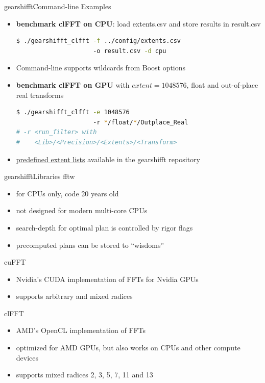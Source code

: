 \documentclass[t,11pt,hyperref={
  pdftitle = {gearshifft},
  pdfsubject = {gearshifft},
  pdfborder={0 0 0},
  colorlinks=true,
  urlcolor=red,
  citecolor=red,
  linkcolor=red,
  pdfauthor={Peter Steinbach, Matthias Werner}
  }
]{beamer}
\begin{document}
\begin{frame}[fragile]{gearshifft}{Command-line Examples}
  \begin{itemize}[<+->]
\item 
\textbf{benchmark clFFT on CPU}: load extents.csv and store results in result.csv
\begin{lstlisting}[numbers=none,language=bash]
$ ./gearshifft_clfft -f ../config/extents.csv
                     -o result.csv -d cpu
\end{lstlisting}

\item Command-line supports wildcards from Boost options
\item 
\textbf{benchmark clFFT on GPU} with $extent=1048576$, float and out-of-place real transforms
\begin{lstlisting}[numbers=none,language=bash]
$ ./gearshifft_clfft -e 1048576
                     -r */float/*/Outplace_Real
# -r <run_filter> with 
#    <Lib>/<Precision>/<Extents>/<Transform>
\end{lstlisting}
\item \href{https://github.com/mpicbg-scicomp/gearshifft/tree/master/config}{predefined extent lists} available in the gearshifft repository
\end{itemize}  
\end{frame}


\begin{frame}{gearshifft}{Libraries}
  fftw
  \begin{itemize}
  \item for CPUs only, code 20 years old
  \item not designed for modern multi-core CPUs    
  \item search-depth for optimal plan is controlled by rigor flags
  \item precomputed plans can be stored to ``wisdoms''
  \end{itemize}
  
  cuFFT 
  \begin{itemize}
  \item Nvidia's CUDA implementation of FFTs for Nvidia GPUs
  \item supports arbitrary and mixed radices
  \end{itemize}

  clFFT
  \begin{itemize}
  \item AMD's OpenCL implementation of FFTs
  \item optimized for AMD GPUs, but also works on CPUs and other compute devices
  \item supports mixed radices 2, 3, 5, 7, 11 and 13
  \end{itemize}
  
\end{frame}
\end{document}
